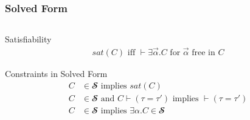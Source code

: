 \documentclass[aspectratio=169]{beamer}
\begin{document}
\begingroup
\large
\begin{frame}[fragile]
  \frametitle{Solved Form}
  \begin{columns}
    \begin{column}{0.6\textwidth}
      \begin{block}{Satisfiability}
        \setlength\abovedisplayskip{0pt}
        \begin{align*}
          sat(C) \text{ iff } ⊢ ∃\Vec α.C \text{ for } \Vec α \text{ free in }
          C
        \end{align*}
      \end{block}
      \begin{block}{Constraints in Solved Form}
        \setlength\abovedisplayskip{0pt}
        \begin{align*}
          C & ∈ 𝓢 \text{ implies } sat(C)                               \\
          C & ∈ 𝓢 \text{ and } C ⊢ (τ = τ′) \text{ implies } ⊢ (τ = τ′) \\
          C & ∈ 𝓢 \text{ implies } ∃α.C ∈ 𝓢
        \end{align*}
      \end{block}
    \end{column}
  \end{columns}
\end{frame}
\endgroup

\begingroup
\Large
\end{document}
